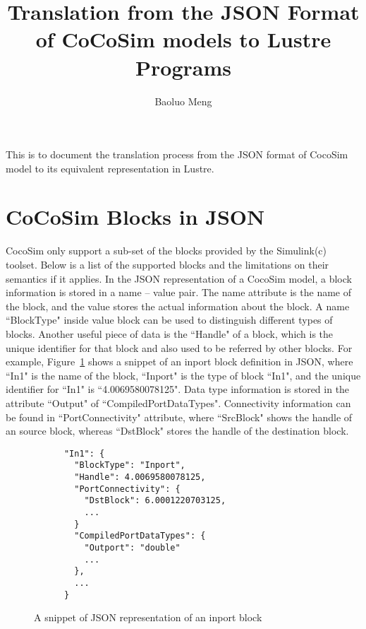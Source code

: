 \documentclass{llncs}
\begin{document}
\title{Translation from the JSON Format of CoCoSim models to Lustre Programs}

\author{Baoluo Meng}

\maketitle

This is to document the translation process from the JSON format of CocoSim model to its equivalent representation in Lustre.


\section{CoCoSim Blocks in JSON}

CocoSim only support a sub-set of the blocks provided by the Simulink(c) toolset. Below is a list of the supported blocks and the limitations on their semantics if it applies. In the JSON representation of a CocoSim model, a block information is stored in a name -- value pair. The name attribute is the name of the block, and the value stores the actual information about the block. A name ``BlockType" inside value block can be used to distinguish different types of blocks. Another useful piece of data is the ``Handle" of a block, which is the unique identifier for that block and also used to be referred by other blocks. For example,  Figure~\ref{jsoninport} shows a snippet of an inport block definition in JSON, where ``In1" is the name of the block, ``Inport" is the type of block ``In1", and the unique identifier for ``In1" is ``4.0069580078125". Data type information is stored in the attribute ``Output" of ``CompiledPortDataTypes". Connectivity information can be found in ``PortConnectivity" attribute, where ``SrcBlock" shows the handle of an source block, whereas ``DstBlock" stores the handle of the destination block. 

\begin{figure}[ht]
\begin{lstlisting}
      "In1": {
        "BlockType": "Inport",
        "Handle": 4.0069580078125,
        "PortConnectivity": {
          "DstBlock": 6.0001220703125,
          ...
        }
        "CompiledPortDataTypes": {
          "Outport": "double"
          ...
        },
        ...        
      }
\end{lstlisting}        
\caption{A snippet of JSON representation of an inport block}
\label{jsoninport}
\end{figure}
\end{document}
